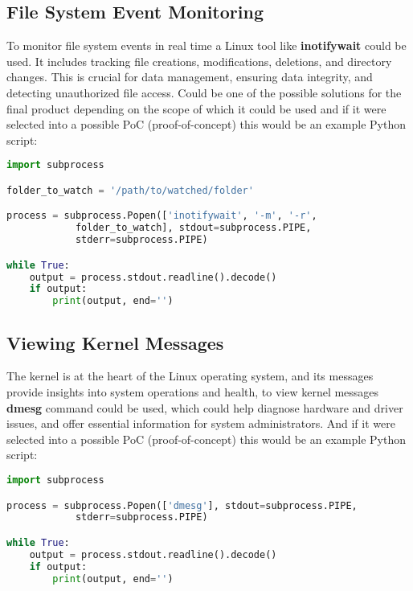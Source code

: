 \documentclass{VUMIFPSmagistrinis}
\begin{document}
\subsection{File System Event Monitoring}
To monitor file system events in real time a Linux tool like \textbf{inotifywait} could be used. It includes tracking file creations, modifications, deletions, and directory changes. This is crucial for data management, ensuring data integrity, and detecting unauthorized file access. Could be one of the possible solutions for the final product depending on the scope of which it could be used and if it were selected into a possible PoC (proof-of-concept) this would be an example Python script:
\begin{lstlisting}[language=Python]
import subprocess

folder_to_watch = '/path/to/watched/folder'

process = subprocess.Popen(['inotifywait', '-m', '-r', 
            folder_to_watch], stdout=subprocess.PIPE, 
            stderr=subprocess.PIPE)

while True:
    output = process.stdout.readline().decode()
    if output:
        print(output, end='')
\end{lstlisting}

\subsection{Viewing Kernel Messages}
The kernel is at the heart of the Linux operating system, and its messages provide insights into system operations and health, to view kernel messages \textbf{dmesg} command could be used, which could help diagnose hardware and driver issues, and offer essential information for system administrators. And if it were selected into a possible PoC (proof-of-concept) this would be an example Python script:
\begin{lstlisting}[language=Python]
import subprocess

process = subprocess.Popen(['dmesg'], stdout=subprocess.PIPE, 
            stderr=subprocess.PIPE)

while True:
    output = process.stdout.readline().decode()
    if output:
        print(output, end='')
\end{lstlisting}
\end{document}
